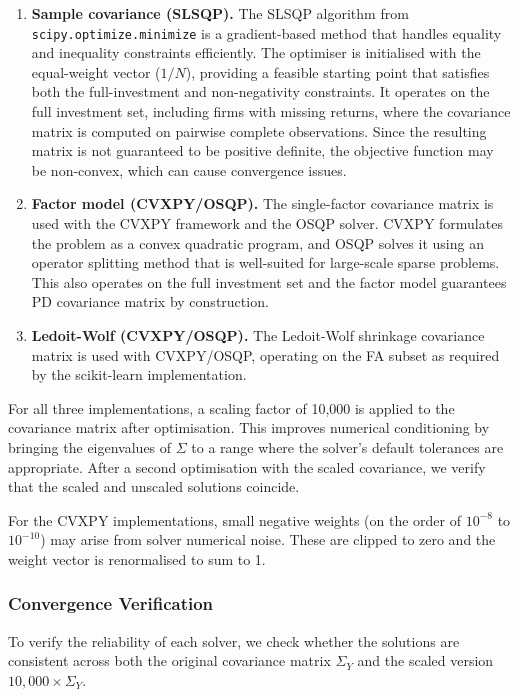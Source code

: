 \documentclass[11pt,a4paper]{article}
\begin{document}
\begin{enumerate}[leftmargin=*]
    \item \textbf{Sample covariance (SLSQP).} The SLSQP algorithm from \texttt{scipy.optimize.minimize} is a gradient-based method that handles equality and inequality constraints efficiently. The optimiser is initialised with the equal-weight vector (\(1/N\)), providing a feasible starting point that satisfies both the full-investment and non-negativity constraints. It operates on the full investment set, including firms with missing returns, where the covariance matrix is computed on pairwise complete observations. Since the resulting matrix is not guaranteed to be positive definite, the objective function may be non-convex, which can cause convergence issues.

    \item \textbf{Factor model (CVXPY/OSQP).} The single-factor covariance matrix is used with the CVXPY framework and the OSQP solver. CVXPY formulates the problem as a convex quadratic program, and OSQP solves it using an operator splitting method that is well-suited for large-scale sparse problems. This also operates on the full investment set and the factor model guarantees PD covariance matrix by construction. 

    \item \textbf{Ledoit-Wolf (CVXPY/OSQP).} The Ledoit-Wolf shrinkage covariance matrix is used with CVXPY/OSQP, operating on the FA subset as required by the scikit-learn implementation.
\end{enumerate}

For all three implementations, a scaling factor of 10,000 is applied to the covariance matrix after optimisation. This improves numerical conditioning by bringing the eigenvalues of \(\Sigma\) to a range where the solver's default tolerances are appropriate. After a second optimisation with the scaled covariance, we verify that the scaled and unscaled solutions coincide.

For the CVXPY implementations, small negative weights (on the order of \(10^{-8}\) to \(10^{-10}\)) may arise from solver numerical noise. These are clipped to zero and the weight vector is renormalised to sum to 1.

\subsubsection{Convergence Verification}

To verify the reliability of each solver, we check whether the solutions 
are consistent across both the original covariance matrix \(\Sigma_Y\) 
and the scaled version \(10{,}000 \times \Sigma_Y\).
\end{document}
